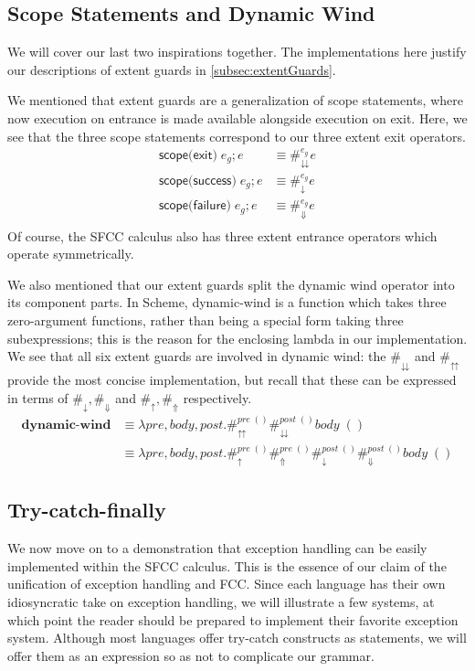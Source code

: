 \documentclass[11pt]{article}
\newcommand{\maybePage}{\newpage}
\begin{document}
\maybePage
\subsection{Scope Statements and Dynamic Wind}

We will cover our last two inspirations together.
The implementations here justify our descriptions of extent guards in \ref{subsec:extentGuards}.

We mentioned that extent guards are a generalization of scope statements, where now execution on entrance is made available alongside execution on exit.
Here, we see that the three scope statements correspond to our three extent exit operators.
\begin{align*}
\textsf{scope(exit)}\;e_g; e &\equiv \#_\downdownarrows^{e_g}e \\
\textsf{scope(success)}\;e_g; e &\equiv \#_\downarrow^{e_g}e \\
\textsf{scope(failure)}\;e_g; e &\equiv \#_\Downarrow^{e_g}e \\
\end{align*}
Of course, the SFCC calculus also has three extent entrance operators which operate symmetrically.

We also mentioned that our extent guards split the dynamic wind operator into its component parts.
In Scheme, dynamic-wind is a function which takes three zero-argument functions, rather than being a special form taking three subexpressions; this is the reason for the enclosing lambda in our implementation.
We see that all six extent guards are involved in dynamic wind:
the $\#_\downdownarrows$ and $\#_\upuparrows$ provide the most concise implementation, but recall that these can be expressed in terms of $\#_\downarrow, \#_\Downarrow$ and $\#_\uparrow, \#_\Uparrow$ respectively.
\begin{align*}
\textbf{dynamic-wind} &\equiv \lambda pre,body,post.
    \#_\upuparrows^{pre\;()}\#_\downdownarrows^{post\;()}body\;() \\
  &\equiv \lambda pre,body,post.
    \#_\uparrow^{pre\;()}\#_\Uparrow^{pre\;()}
    \#_\downarrow^{post\;()}\#_\Downarrow^{post\;()}
    body\;()
\end{align*}


\maybePage
\subsection{Try-catch-finally}


We now move on to a demonstration that exception handling can be easily implemented within the SFCC calculus.
This is the essence of our claim of the unification of exception handling and FCC.
Since each language has their own idiosyncratic take on exception handling, we will illustrate a few systems, at which point the reader should be prepared to implement their favorite exception system.
Although most languages offer try-catch constructs as statements, we will offer them as an expression so as not to complicate our grammar.
\end{document}
